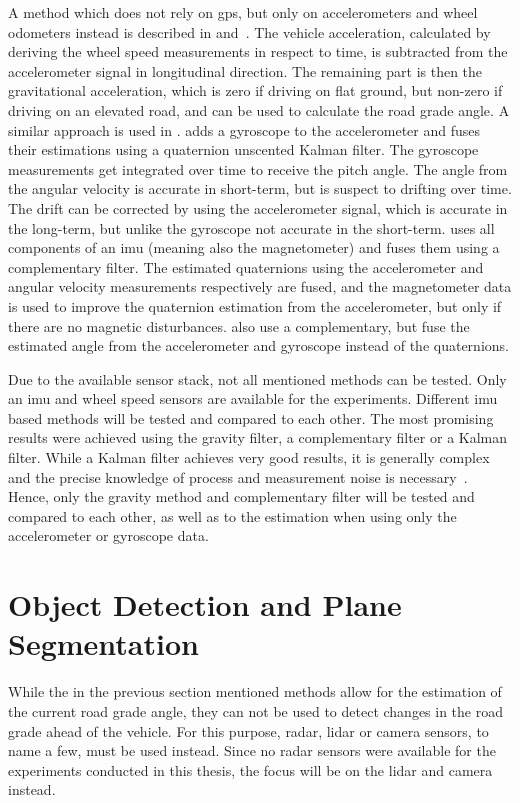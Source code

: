 A method which does not rely on \gls{gps}, but only on accelerometers and wheel odometers instead is described in \cite{Nilsson2012} and~\cite{Palella2016}.
The vehicle acceleration, calculated by deriving the wheel speed measurements in respect to time, is subtracted from the accelerometer signal in longitudinal direction.
The remaining part is then the gravitational acceleration, which is zero if driving on flat ground, but non-zero if driving on an elevated road, and can be used to calculate the road grade angle.
A similar approach is used in \cite{Sentouh2008}.
\cite{He2020} adds a gyroscope to the accelerometer and fuses their estimations using a quaternion unscented Kalman filter.
The gyroscope measurements get integrated over time to receive the pitch angle.
The angle from the angular velocity is accurate in short-term, but is suspect to drifting over time.
The drift can be corrected by using the accelerometer signal, which is accurate in the long-term, but unlike the gyroscope not accurate in the short-term.
\cite{Wu2016} uses all components of an \gls{imu} (meaning also the magnetometer) and fuses them using a complementary filter.
The estimated quaternions using the accelerometer and angular velocity measurements respectively are fused, and the magnetometer data is used to improve the quaternion estimation from the accelerometer, but only if there are no magnetic disturbances.
\cite{Euston2008} also use a complementary, but fuse the estimated angle from the accelerometer and gyroscope instead of the quaternions.

Due to the available sensor stack, not all mentioned methods can be tested.
Only an \gls{imu} and wheel speed sensors are available for the experiments.
Different \gls{imu} based methods will be tested and compared to each other.
The most promising results were achieved using the gravity filter, a complementary filter or a Kalman filter.
While a Kalman filter achieves very good results, it is generally complex and the precise knowledge of process and measurement noise is necessary~\cite{Higgins1975}.
Hence, only the gravity method and complementary filter will be tested and compared to each other, as well as to the estimation when using only the accelerometer or gyroscope data.



\section[Plane segmentation]{Object Detection and Plane Segmentation}
While the in the previous section mentioned methods allow for the estimation of the current road grade angle, they can not be used to detect changes in the road grade ahead of the vehicle.
For this purpose, \gls{radar}, \gls{lidar} or camera sensors, to name a few, must be used instead.
Since no \gls{radar} sensors were available for the experiments conducted in this thesis, the focus will be on the \gls{lidar} and camera instead.

